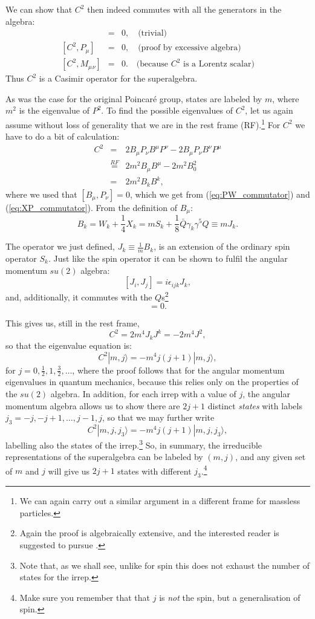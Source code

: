 \documentclass[notes.tex]{subfiles}
\begin{document}
We can show that $C^2$ then indeed commutes with all the generators in the algebra:
\begin{eqnarray*}
[C^2, Q_a] &=& 0, \quad\text{(trivial)}\\
{}[C^2, P_\mu] &=& 0, \quad\text{(proof by excessive algebra)}\\
{}[C^2, M_\mu{}_\nu] &=& 0. \quad\text{(because $C^2$ is a Lorentz scalar)}
\end{eqnarray*}
Thus $C^2$ is a Casimir operator for the superalgebra.

As was the case for the original Poincaré group, states are labeled by $m$, where $m^2$ is the eigenvalue of $P^2$. To find the possible eigenvalues of $C^2$, let us again assume without loss of generality that we are in the rest frame (RF).\footnote{We can again carry out a similar argument in a different frame for massless particles.} For $C^2$ we have to do a bit of calculation:
\begin{eqnarray*}
C^2 &=& 2B_\mu P_\nu B^\mu P^\nu - 2B_\mu P_\nu B^\nu P^\mu\\
&\stackrel{RF}{=}& 2m^2 B_\mu B^\mu - 2m^2 B_0^2\\
&=& 2m^2 B_k B^k,
\end{eqnarray*}
where we used that $[B_\mu,P_\nu]=0$, which we get from  (\ref{eq:PW_commutator}) and (\ref{eq:XP_commutator}). From the definition of $B_\mu$:
\begin{equation}
B_k = W_k + \frac{1}{4}X_k = mS_k + \frac{1}{8}\bar{Q}\gamma_k \gamma^5 Q \equiv m J_k.
\end{equation}

The operator we just defined, $J_k \equiv \frac{1}{m} B_k$, is an extension of the ordinary spin operator $S_k$. Just like the spin operator it can be shown to fulfil the angular momentum $su(2)$ algebra:
\[[J_i, J_j] = i\epsilon_{ijk}J_k,\]
and, additionally, it commutes with the $Q$s\footnote{Again the proof is algebraically extensive, and  the interested reader is suggested to pursue \cite{IntrSUSY2010}.}
\begin{equation}
[J_k,Q_a]=0.
\label{eq:JQ}
\end{equation} 

This gives us, still in the rest frame,
\[C^2 = 2m^4 J_k J^k= -2m^4 J^2,\]
so that the eigenvalue equation is:
\[C^2|m, j \rangle = -m^4 j(j+1)|m, j\rangle,\]
for $j=0,\frac{1}{2},1,\frac{3}{2},\ldots$, where the proof follows that for the angular momentum eigenvalues in quantum mechanics, because this  relies only on the properties of the $su(2)$ algebra. In addition, for each irrep with a value of $j$, the angular momentum algebra allows us to show there are $2j+1$ distinct {\it states} with labels $j_3 = -j, -j+1,\ldots,j-1,j$, so that we may  further  write
\[C^2|m, j, j_3\rangle =- m^4 j(j+1)|m, j, j_3\rangle,\]
labelling also the states of the irrep.\footnote{Note that, as we shall see,  unlike for spin  this does not exhaust the number of states for the irrep.}
So, in summary, the irreducible representations of the superalgebra can be labeled by $(m, j)$, and any given set of $m$ and $j$ will give us $2j+1$ states with different $j_3$.\footnote{Make sure you remember that that $j$ is {\it not} the spin, but a generalisation of spin.}
\end{document}
